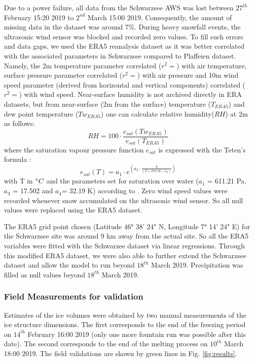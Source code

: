 \documentclass[utf8]{frontiersSCNS} %
\begin{document}
Due to a power failure, all data from the Schwarzsee AWS was lost between $27^{th}$ February 15:20 2019 to $2^{nd}$
March 15:00 2019. Consequently, the amount of missing data in the dataset was around 7\%.  During heavy snowfall
events, the ultrasonic wind sensor was blocked and recorded zero values. To fill such errors and data gaps, we used the
ERA5 reanalysis dataset as it was better correlated with the associated parameters in Schwarzsee compared to Plaffeien
dataset. Namely, the 2m temperature parameter correlated ($r^2 = $) with air temperature, surface pressure parameter
correlated ($r^2 = $) with air pressure and 10m wind speed parameter (derived from horizontal and vertical components)
correlated ($r^2 = $) with wind speed. Near-surface humidity is not archived directly in ERA datasets, but from
near-surface (2m from the surface) temperature ($T_{ERA5}$) and dew point temperature ($Tw_{ERA5}$) one can calculate
relative humidity($RH$) at 2m as follows: \begin{equation} RH = 100 \cdot \frac{e_{sat}(Tw_{ERA5})}{e_{sat}(T_{ERA5})}
  \end{equation} where the saturation vapour pressure function $e_{sat}$ is expressed with the Teten's formula
  \citep{Tetens}: \begin{equation} e_{sat}(T)= a_1 \cdot e^{(a_3 \cdot \frac{T}{(T+273.16-a_4)})} \end{equation} with T
  in $\degree C$ and the parameters set for saturation over water ($a_1$ = 611.21 Pa, $a_3$ = 17.502 and $a_4$= 32.19
  K) according to \cite{Buck_1981}.  Zero wind speed values were recorded whenever snow accumulated on the ultrasonic
  wind sensor. So all null values were replaced using the ERA5 dataset. 

The ERA5 grid point chosen (Latitude 46° 38' 24" N, Longitude 7° 14' 24" E) for the Schwarzsee site was around 9 km
away from the actual site.  So all the ERA5 variables were fitted with the Schwarzee dataset via linear regressions.
Through this modified ERA5 dataset, we were also able to further extend the Schwarzsee dataset and allow the model to
run beyond $18^{th}$ March 2019. Precipitation was filled as null values beyond $18^{th}$ March 2019.


\subsubsection{Field Measurements for validation} \label{section:validation} Estimates of the ice volumes were obtained
by two manual measurements of the ice structure dimensions. The first corresponds to the end of the freezing period on
$14^{th}$ February 16:00 2019 (only one more fountain run was possible after this date). The second corresponds to the end of
the melting process on $10^{th}$ March 18:00 2019. The field validations are shown by green lines in Fig.
\ref{fig:results}.
\end{document}

